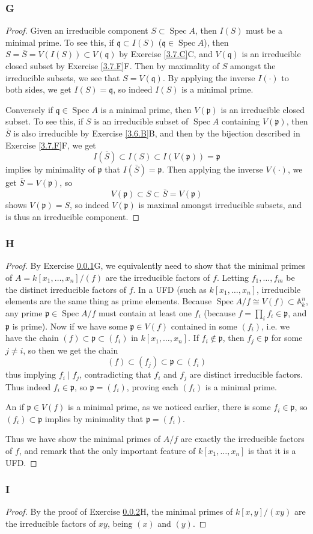 \documentclass{article}
\newcommand{\A}{\mathbb{A}}
\newcommand{\frkp}{\mathfrak{p}}
\newcommand{\frkq}{\mathfrak{q}}
\DeclareMathOperator{\Spec}{\mathrm{Spec}}
\theoremstyle{definition} %
\begin{document}
\subsubsection{G}\label{3.7.G}
\begin{proof}
    Given an irreducible component $S\subset \Spec A$, then $I(S)$ must be a minimal prime. To see this, if $\frkq \subset I(S)$ ($\frkq \in \Spec A$), then $S=\bar S = V(I(S))\subset V(\frkq)$ by Exercise \ref{3.7.C}C, and $V(\frkq)$ is an irreducible closed subset by Exercise \ref{3.7.F}F. Then by maximality of $S$ amongst the irreducible subsets, we see that $S=V(\frkq)$. By applying the inverse $I(\cdot)$ to both sides, we get $I(S)=\frkq$, so indeed $I(S)$ is a minimal prime.

    Conversely if $\frkq \in \Spec A$ is a minimal prime, then $V(\frkp)$ is an irreducible closed subset. To see this, if $S$ is an irreducible subset of $\Spec A$ containing $V(\frkp)$, then $\bar S$ is also irreducible by Exercise \ref{3.6.B}B, and then by the bijection described in Exercise \ref{3.7.F}F, we get
    \[
    I(\bar S) \subset I(S)  \subset I(V(\frkp))=\frkp
    \]
    implies by minimality of $\frkp$ that $I(\bar S)=\frkp$. Then applying the inverse $V(\cdot)$, we get $\bar S = V(\frkp)$, so
    \[
    V(\frkp)\subset S \subset \bar S = V(\frkp)
    \]
    shows $V(\frkp)=S$, so indeed $V(\frkp)$ is maximal amongst irreducible subsets, and is thus an irreducible component.
\end{proof}
\subsubsection{H}\label{3.7.H}
\begin{proof}
    By Exercise \ref{3.7.G}G, we equivalently need to show that the minimal primes of $A=k[x_1,\dots,x_n]/(f)$ are the irreducible factors of $f$. Letting $f_1,\dots, f_m$ be the distinct irreducible factors of $f$. In a UFD (such as $k[x_1,\dots,x_n]$, irreducible elements are the same thing as prime elements. Because $\Spec A/f \cong V(f) \subset \A^n_k$, any prime $\frkp \in \Spec A/f$ must contain at least one $f_i$ (because $f=\prod_i f_i\in \frkp$, and $\frkp$ is prime). Now if we have some $\frkp \in V(f)$ contained in some $(f_i)$, i.e. we have the chain $(f)\subset \frkp \subset (f_i)$ in $k[x_1,\dots, x_n]$. If $f_i \notin \frkp$, then $f_j\in \frkp$ for some $j \ne i$, so then we get the chain
    \[
    (f)\subset (f_j) \subset \frkp \subset (f_i)
    \]
    thus implying $f_i \mid f_j$, contradicting that $f_i$ and $f_j$ are distinct irreducible factors. Thus indeed $f_i \in \frkp$, so $\frkp =(f_i)$, proving each $(f_i)$ is a minimal prime.

    An if $\frkp \in V(f)$ is a minimal prime, as we noticed earlier, there is some $f_i \in \frkp$, so $(f_i)\subset \frkp$ implies by minimality that $\frkp = (f_i)$.

    Thus we have show the minimal primes of $A/f$ are exactly the irreducible factors of $f$, and remark that the only important feature of $k[x_1,\dots, x_n]$ is that it is a UFD.
\end{proof}
\subsubsection{I}\label{3.7.I}
\begin{proof}
    By the proof of Exercise \ref{3.7.H}H, the minimal primes of $k[x,y]/(xy)$ are the irreducible factors of $xy$, being $(x)$ and $(y)$.
\end{proof}
\printbibliography
\end{document}
